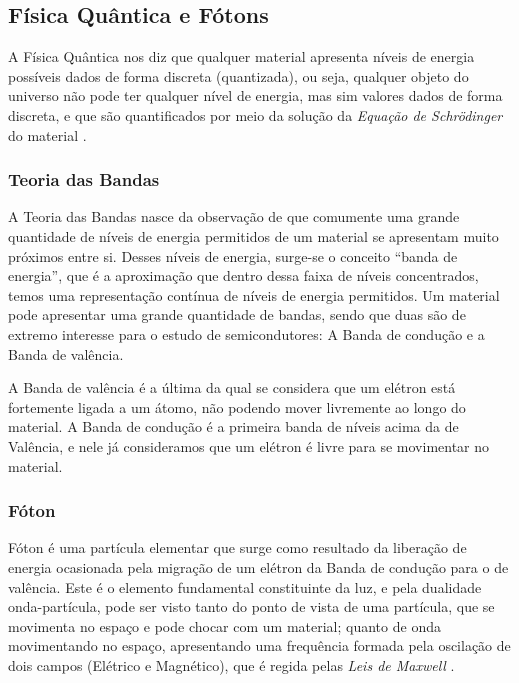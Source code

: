 \subsection{Física Quântica e Fótons}
A Física Quântica nos diz que qualquer material apresenta níveis de energia possíveis dados de forma discreta (quantizada), ou seja, qualquer objeto do universo não pode ter qualquer nível de energia, mas sim valores dados de forma discreta, e que são quantificados por meio da solução da \textit{Equação de Schrödinger} do material \cite{Sze, JohnSingleton}.


\subsubsection{Teoria das Bandas}

A Teoria das Bandas nasce da observação de que comumente uma grande quantidade de níveis de energia permitidos de um material se apresentam muito próximos entre si. Desses níveis de energia, surge-se o conceito “banda de energia”, que \'e a aproximação que dentro dessa faixa de níveis concentrados, temos uma representação contínua de níveis de energia permitidos. Um material pode apresentar uma grande quantidade de bandas, sendo que duas são de extremo interesse para o estudo de semicondutores: A Banda de condução e a Banda de valência.

A Banda de valência \'e a última da qual se considera que um el\'etron está fortemente ligada a um átomo, não podendo mover livremente ao longo do material. A Banda de condução \'e a primeira banda de níveis acima da de Valência, e nele já consideramos que um el\'etron \'e livre para se movimentar no material.

\subsubsection{Fóton}

Fóton \'e uma partícula elementar que surge como resultado da liberação de energia ocasionada pela migração de um el\'etron da Banda de condução para o de valência. Este \'e o elemento fundamental constituinte da luz, e pela dualidade onda-partícula, pode ser visto tanto do ponto de vista de uma partícula, que se movimenta no espaço e pode chocar com um material; quanto de onda movimentando no espaço, apresentando uma frequência formada pela oscilação de dois campos (El\'etrico e Magn\'etico), que \'e regida pelas \textit{Leis de Maxwell} \cite{Sze, JohnSingleton}.

